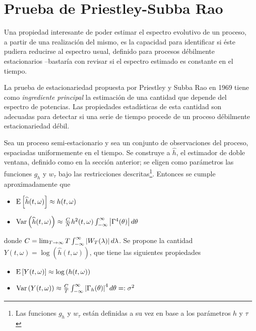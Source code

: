 
\section{Prueba de Priestley-Subba Rao}

Una propiedad interesante de poder estimar el espectro evolutivo de un proceso, a partir de una 
realización del mismo, es la capacidad para identificar si éste pudiera reducirse al espectro 
usual, definido para procesos débilmente estacionarios --bastaría con revisar si el espectro 
estimado es constante en el tiempo.

La prueba de estacionariedad propuesta por Priestley y Subba Rao en 1969 \cite{Priestley69} tiene 
como \textit{ingrediente principal} la estimación de una cantidad que depende del espectro de
potencias. Las propiedades estadísticas de esta cantidad son adecuadas para detectar si una serie
de tiempo procede de un proceso débilmente estacionariedad débil.

Sea \xt un proceso semi-estacionario y sea \xtd un conjunto de observaciones del proceso, 
espaciadas uniformemente en el tiempo.
Se construye a $\widehat{h}$, el estimador de doble ventana, definido como en la sección anterior;
se eligen como parámetros las funciones $g_h$ y $w_\tau$ bajo las restricciones 
descritas\footnote{Las funciones $g_h$ y $w_{\tau}$ están definidas a su vez en base a los 
parámetros $h$ y $\tau$}.
Entonces se cumple aproximadamente que
%
\begin{itemize}
\item $\mathrm{E}\left[ \widehat{h}(t,\omega) \right] \approx h(t,\omega)$
\item $\mathrm{Var}\left( \widehat{h}(t,\omega) \right) \approx 
\frac{C}{N} h^{2}(t,\omega) \int_{-\infty}^{\infty} \left| \Gamma^{4}(\theta) \right| d\theta$
\end{itemize}
%
donde $C = \lim_{T\rightarrow \infty} T \int_{-\infty}^{\infty} \left| W_T(\lambda) \right| d\lambda$.
Se propone la cantidad $Y(t,\omega) = \log\left(\widehat{h}(t,\omega)\right)$, que tiene 
las siguientes propiedades
%
\begin{itemize}
\item $\mathrm{E}\left[ Y(t,\omega) \right] \approx \log\left(h(t,\omega)\right)$
\item $\mathrm{Var}\left( Y(t,\omega) \right) \approx 
\frac{C}{T} \int_{-\infty}^{\infty} \left| \Gamma_h(\theta) \right|^{4} d\theta =: \sigma^{2}$
\end{itemize}
%

